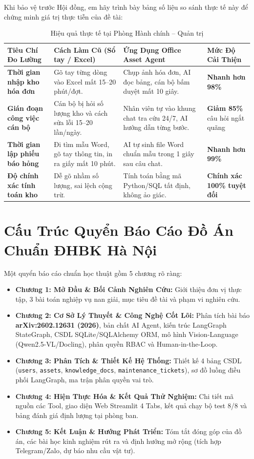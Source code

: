 \documentclass[11pt,a4paper]{article}
\begin{document}
Khi bảo vệ trước Hội đồng, em hãy trình bày bảng số liệu so sánh thực tế này để chứng minh giá trị thực tiễn của đề tài:

\begin{table}[H]
\centering
\small
\begin{tabularx}{\textwidth}{l X X X}
\toprule
\textbf{Tiêu Chí Đo Lường} & \textbf{Cách Làm Cũ (Sổ tay / Excel)} & \textbf{Ứng Dụng Office Asset Agent} & \textbf{Mức Độ Cải Thiện} \\
\midrule
\textbf{Thời gian nhập kho hóa đơn} & Gõ tay từng dòng vào Excel mất 15--20 phút/đợt. & Chụp ảnh hóa đơn, AI đọc bảng, cán bộ bấm duyệt mất 10 giây. & \textbf{Nhanh hơn 98\%} \\
\textbf{Gián đoạn công việc cán bộ} & Cán bộ bị hỏi số lượng kho và cách sửa lỗi 15--20 lần/ngày. & Nhân viên tự vào khung chat tra cứu 24/7, AI hướng dẫn từng bước. & \textbf{Giảm 85\%} câu hỏi ngắt quãng \\
\textbf{Thời gian lập phiếu báo hỏng} & Đi tìm mẫu Word, gõ tay thông tin, in ra giấy mất 10 phút. & AI tự sinh file Word chuẩn mẫu trong 1 giây sau câu chat. & \textbf{Nhanh hơn 99\%} \\
\textbf{Độ chính xác tính toán kho} & Dễ gõ nhầm số lượng, sai lệch cộng trừ. & Tính toán bằng mã Python/SQL tất định, không ảo giác. & \textbf{Chính xác 100\% tuyệt đối} \\
\bottomrule
\end{tabularx}
\caption{Hiệu quả thực tế tại Phòng Hành chính -- Quản trị}
\end{table}

\section{Cấu Trúc Quyển Báo Cáo Đồ Án Chuẩn ĐHBK Hà Nội}

Một quyển báo cáo chuẩn học thuật gồm 5 chương rõ ràng:
\begin{itemize}
    \item \textbf{Chương 1: Mở Đầu \& Bối Cảnh Nghiên Cứu:} Giới thiệu đơn vị thực tập, 3 bài toán nghiệp vụ nan giải, mục tiêu đề tài và phạm vi nghiên cứu.
    \item \textbf{Chương 2: Cơ Sở Lý Thuyết \& Công Nghệ Cốt Lõi:} Phân tích bài báo \textbf{arXiv:2602.12631 (2026)}, bản chất AI Agent, kiến trúc LangGraph StateGraph, CSDL SQLite/SQLAlchemy ORM, mô hình Vision-Language (Qwen2.5-VL/Docling), phân quyền RBAC và Human-in-the-Loop.
    \item \textbf{Chương 3: Phân Tích \& Thiết Kế Hệ Thống:} Thiết kế 4 bảng CSDL (\texttt{users}, \texttt{assets}, \texttt{knowledge\_docs}, \texttt{maintenance\_tickets}), sơ đồ luồng điều phối LangGraph, ma trận phân quyền vai trò.
    \item \textbf{Chương 4: Hiện Thực Hóa \& Kết Quả Thử Nghiệm:} Chi tiết mã nguồn các Tool, giao diện Web Streamlit 4 Tabs, kết quả chạy bộ test 8/8 và bảng đánh giá định lượng tại phòng ban.
    \item \textbf{Chương 5: Kết Luận \& Hướng Phát Triển:} Tóm tắt đóng góp của đồ án, các bài học kinh nghiệm rút ra và định hướng mở rộng (tích hợp Telegram/Zalo, dự báo nhu cầu vật tư).
\end{itemize}
\end{document}
